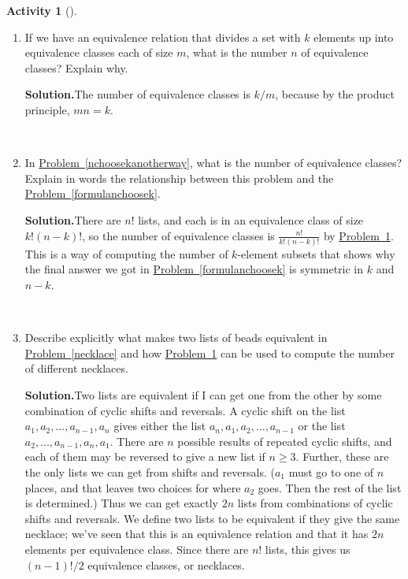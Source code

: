 \documentclass[10pt,]{book}
\theoremstyle{plain}
\theoremstyle{definition}
\newtheorem{activity}[project]{Activity}
\numberwithin{equation}{chapter}
\begin{document}
\begin{activity}[]\label{EquivPrincipleProblem}
~\par
\begin{enumerate}[label=(\alph*)]
 \item If we have an equivalence relation that divides a set with \(k\) elements up into equivalence classes each of size \(m\), what is the number \(n\) of equivalence classes? Explain why.%
\par\medskip\noindent%
\textbf{Solution.}\quad The number of equivalence classes is \(k/m\), because by the product principle, \(mn=k\).%

~\par
\item In \hyperref[nchoosekanotherway]{Problem~\ref{nchoosekanotherway}}, what is the number of equivalence classes? Explain in words the relationship between this problem and the \hyperref[formulanchoosek]{Problem~\ref{formulanchoosek}}.%
\par\medskip\noindent%
\textbf{Solution.}\quad There are \(n!\) lists, and each is in an equivalence class of size \(k!(n-k)!\), so the number of equivalence classes is \(\frac{n!}{k!(n-k)!}\) by \hyperref[EquivPrincipleProblem]{Problem~\ref{EquivPrincipleProblem}}. This is a way of computing the number of \(k\)-element subsets that shows why the final answer we got in \hyperref[formulanchoosek]{Problem~\ref{formulanchoosek}} is symmetric in \(k\) and \(n-k\).%

~\par
\item Describe explicitly what makes two lists of beads equivalent in \hyperref[necklace]{Problem~\ref{necklace}} and how \hyperref[EquivPrincipleProblem]{Problem~\ref{EquivPrincipleProblem}} can be used to compute the number of different necklaces.%
\par\medskip\noindent%
\textbf{Solution.}\quad Two lists are equivalent if I can get one from the other by some combination of cyclic shifts and reversals. A cyclic shift on the list \(a_1,a_2,\ldots,a_{n-1},a_n\) gives either the list \(a_n,a_1,a_2,\ldots ,a_{n-1}\) or the list \(a_2,\ldots,a_{n-1},a_n,a_1\). There are \(n\) possible results of repeated cyclic shifts, and each of them may be reversed to give a new list if \(n\ge 3\). Further, these are the only lists we can get from shifts and reversals. (\(a_1\) must go to one of \(n\) places, and that leaves two choices for where \(a_2\) goes. Then the rest of the list is determined.) Thus we can get exactly \(2n\) lists from combinations of cyclic shifts and reversals. We define two lists to be equivalent if they give the same necklace; we've seen that this is an equivalence relation and that it has \(2n\) elements per equivalence class. Since there are \(n!\) lists, this gives us \((n-1)!/2\) equivalence classes, or necklaces.%


\end{enumerate}
\end{activity}
\end{document}
